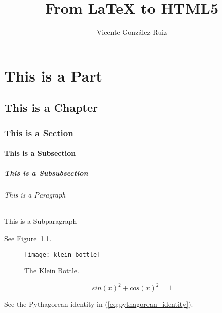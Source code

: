 \documentclass{report}
\begin{document}
\title{From {\LaTeX} to HTML5}
\author{Vicente Gonz\'alez Ruiz}

\maketitle

\part{This is a Part}
\chapter{This is a Chapter}
\section{This is a Section~\cite{greenwade93}}
\subsection{This is a Subsection}
\subsubsection{This is a Subsubsection}
\paragraph{This is a Paragraph}
\subparagraph{This is a Subparagraph}
See Figure~\ref{fig:bottle}.

\begin{figure}
  \ifx \HCode\Undfef
  \begin{center}
    \texttt{[image: klein\_bottle]}
  \end{center}
  \else
  \fi
  \caption{The Klein Bottle.\label{fig:bottle}}
\end{figure}

\begin{equation}
  sin(x)^2 + cos(x)^2 = 1
  \label{eq:pythagorean_identity}
\end{equation}

See the Pythagorean identity in (\ref{eq:pythagorean_identity}).



\end{document}
